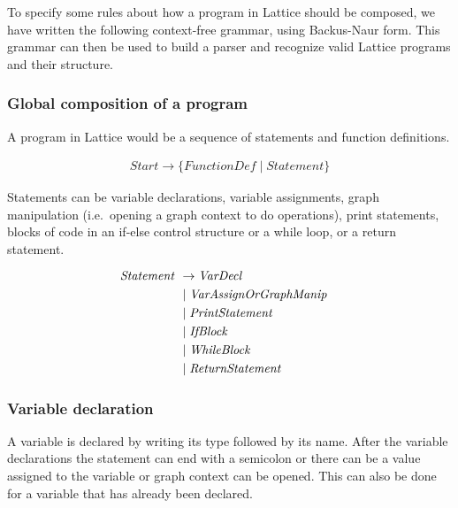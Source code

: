 To specify some rules about how a program in Lattice should be composed, we have written the following context-free grammar, using Backus-Naur form.
This grammar can then be used to build a parser and recognize valid Lattice programs and their structure.

\subsubsection*{Global composition of a program}

A program in Lattice would be a sequence of statements and function definitions.

\begin{align*}
    \mathit{Start} \rightarrow \{ \mathit{FunctionDef} \mid \mathit{Statement} \}
\end{align*}

Statements can be variable declarations, variable assignments, graph manipulation (i.e.\ opening a graph context to do operations), print statements, blocks of code in an if-else control structure or a while loop, or a return statement.

\begin{align*}
    \omit $\mathit{Statement}$ \hfil& \rightarrow \mathit{VarDecl} \\
    & \mid \mathit{VarAssignOrGraphManip} \\
    & \mid \mathit{PrintStatement} \\
    & \mid \mathit{IfBlock} \\
    & \mid \mathit{WhileBlock} \\
    & \mid \mathit{ReturnStatement} \\
\end{align*}

\subsubsection*{Variable declaration}

A variable is declared by writing its type followed by its name.
After the variable declarations the statement can end with a semicolon or there can be a value assigned to the variable or graph context can be opened.
This can also be done for a variable that has already been declared.

